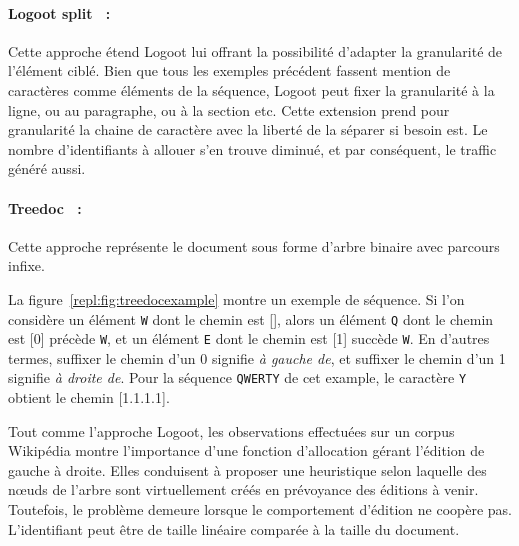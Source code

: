 \paragraph{Logoot split~\cite{mehdi2014merging} :} Cette approche étend Logoot
lui offrant la possibilité d'adapter la granularité de l'élément ciblé. Bien que
tous les exemples précédent fassent mention de caractères comme éléments de la
séquence, Logoot peut fixer la granularité à la ligne, ou au paragraphe, ou à la
section etc. Cette extension prend pour granularité la chaine de caractère avec
la liberté de la séparer si besoin est. Le nombre d'identifiants à allouer s'en
trouve diminué, et par conséquent, le traffic généré aussi.

\paragraph{Treedoc~\cite{letia2009crdts, preguica2009commutative} :} Cette
approche représente le document sous forme d'arbre binaire avec parcours infixe.
  
\begin{figure*}
  \begin{center}
    
    \caption{\label{repl:fig:treedocexample}Example de sequence dont les
      chemins sont alloués grâce à Treedoc.}
  \end{center}
\end{figure*}

\noindent La figure~\ref{repl:fig:treedocexample} montre un exemple de
séquence. Si l'on considère un élément \texttt{W} dont le chemin est [], alors
un élément \texttt{Q} dont le chemin est [0] précède \texttt{W}, et un élément
\texttt{E} dont le chemin est [1] succède \texttt{W}. En d'autres termes,
suffixer le chemin d'un 0 signifie \emph{à gauche de}, et suffixer le chemin
d'un 1 signifie \emph{à droite de}. Pour la séquence \texttt{QWERTY} de cet
example, le caractère \texttt{Y} obtient le chemin [1.1.1.1].
  
\noindent Tout comme l'approche Logoot, les observations effectuées sur un
corpus Wikipédia montre l'importance d'une fonction d'allocation gérant
l'édition de gauche à droite. Elles conduisent à proposer une heuristique selon
laquelle des nœuds de l'arbre sont virtuellement créés en prévoyance des
éditions à venir. Toutefois, le problème demeure lorsque le comportement
d'édition ne coopère pas. L'identifiant peut être de taille linéaire comparée à
la taille du document.




